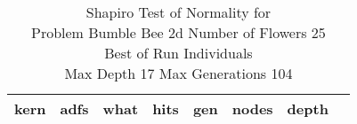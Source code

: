 \begin{table}[H]
\caption{Shapiro Test of Normality for \\ Problem  Bumble Bee 2d  Number of Flowers 25\\Best of Run Individuals \\ Max Depth 17 Max Generations 104\\}
\begin{center}
\scalebox{0.8} %
{
\begin{tabular}{lrrrrrrr}
\hline
kern & adfs & what & hits & gen & nodes & depth \\
\hline


\end{tabular}
}
\end{center}
\end{table}

